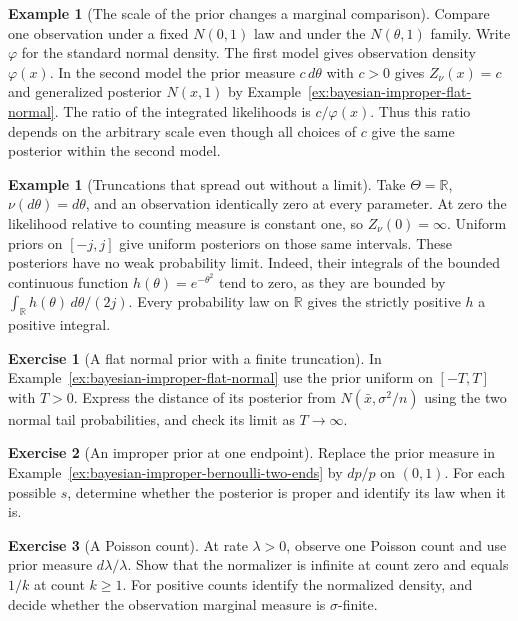 \documentclass[11pt,oneside]{book}
\theoremstyle{definition}
\newtheorem{example}[theorem]{Example}
\newtheorem{exercise}{Exercise}[section]
\theoremstyle{remark}
\newcommand{\R}{\mathbb R}
\begin{document}
\begin{example}[The scale of the prior changes a marginal comparison]
\label{ex:bayesian-improper-scale-comparison}
Compare one observation under a fixed $N(0,1)$ law and under
the $N(\theta,1)$ family. Write $\varphi$ for the standard
normal density. The first model gives observation density
$\varphi(x)$. In the second model the prior measure $c\,d\theta$
with $c>0$ gives $Z_\nu(x)=c$ and generalized posterior
$N(x,1)$ by Example~\ref{ex:bayesian-improper-flat-normal}.
The ratio of the integrated likelihoods is $c/\varphi(x)$.
Thus this ratio depends on the arbitrary scale even though
all choices of $c$ give the same posterior within the second model.
\end{example}

\begin{example}[Truncations that spread out without a limit]
\label{ex:bayesian-improper-uninformative-truncations}
Take $\Theta=\R$, $\nu(d\theta)=d\theta$, and an observation
identically zero at every parameter. At zero the likelihood
relative to counting measure is constant one, so $Z_\nu(0)=\infty$.
Uniform priors on $[-j,j]$ give uniform posteriors on those
same intervals. These posteriors have no weak probability
limit. Indeed, their integrals of the bounded continuous
function $h(\theta)=e^{-\theta^2}$ tend to zero, as they are
bounded by $\int_\R h(\theta)\,d\theta/(2j)$. Every probability
law on $\R$ gives the strictly positive $h$ a positive integral.
\end{example}

\begin{exercise}[A flat normal prior with a finite truncation]
\label{exer:bayesian-improper-normal-truncation}
In Example~\ref{ex:bayesian-improper-flat-normal} use the prior
uniform on $[-T,T]$ with $T>0$. Express the distance of its
posterior from $N(\bar x,\sigma^2/n)$ using the two normal tail
probabilities, and check its limit as $T\to\infty$.
\end{exercise}

\begin{exercise}[An improper prior at one endpoint]
\label{exer:bayesian-improper-bernoulli-one-end}
Replace the prior measure in
Example~\ref{ex:bayesian-improper-bernoulli-two-ends} by
$dp/p$ on $(0,1)$. For each possible $s$, determine whether
the posterior is proper and identify its law when it is.
\end{exercise}

\begin{exercise}[A Poisson count]
\label{exer:bayesian-improper-poisson-count}
At rate $\lambda>0$, observe one Poisson count and use prior
measure $d\lambda/\lambda$. Show that the normalizer is infinite
at count zero and equals $1/k$ at count $k\geq1$. For positive
counts identify the normalized density, and decide whether
the observation marginal measure is $\sigma$-finite.
\end{exercise}
\end{document}
